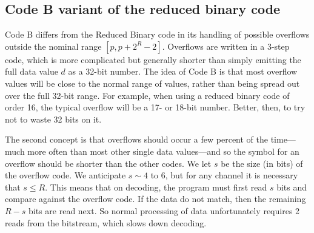 \documentclass[11pt]{article}
\begin{document}
\subsection{Code B variant of the reduced binary code}\label{codeB}


Code B differs from the Reduced Binary code in its handling of possible
overflows outside the nominal range $[p, p+2^R-2]$.  Overflows
are written in a 3-step code, which is more complicated but generally
shorter than simply emitting the full data value $d$ as a 32-bit
number.  The idea of Code B is that most overflow values will be close
to the normal range of values, rather than being spread out over the
full 32-bit range.  For example, when using a reduced binary code of
order 16, the typical overflow will be a 17- or 18-bit number.
Better, then, to try not to waste 32 bits on it.

The second concept is that overflows should occur a few percent of the
time---much more often than most other single data values---and so the
symbol for an overflow should be shorter than the other codes.  We let
$s$ be the size (in bits) of the overflow code.  We anticipate $s\sim
4$ to $6$, but for any channel it is necessary that $s\le R$.  This
means that on decoding, the program must first read $s$ bits and
compare against the overflow code.  If the data do not match, then the
remaining $R-s$ bits are read next.  So normal processing of data
unfortunately requires 2 reads from the bitstream, which slows down
decoding.

\end{document}
